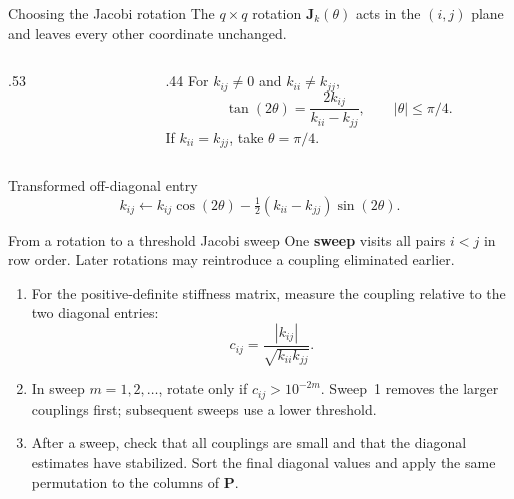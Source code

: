 \documentclass[aspectratio=169]{beamer}
\begin{document}
\begin{frame}{Choosing the Jacobi rotation}
  \small
  The $q\times q$ rotation $\mathbf J_{k}(\theta)$ acts in the $(i,j)$ plane
  and leaves every other coordinate unchanged.
  \vspace{0.2cm}
  \begin{columns}[c,onlytextwidth]
    \begin{column}{.53\textwidth}
      \centering
    \end{column}
    \begin{column}{.44\textwidth}
      \small For $k_{ij}\ne0$ and $k_{ii}\ne k_{jj}$,
      \[
        \tan(2\theta)=\frac{2k_{ij}}{k_{ii}-k_{jj}},
        \qquad |\theta|\leq\pi/4 .
      \]
      If $k_{ii}=k_{jj}$, take $\theta=\pi/4$.
    \end{column}
  \end{columns}
  \vspace{0.2cm}
  \begin{block}{Transformed off-diagonal entry}
    \[
      k_{ij}\gets k_{ij}\cos(2\theta)
      -\tfrac12(k_{ii}-k_{jj})\sin(2\theta).
    \]
  \end{block}
\end{frame}

\begin{frame}{From a rotation to a threshold Jacobi sweep}
  \small
  One \textbf{sweep} visits all pairs $i<j$ in row order. Later rotations may
  reintroduce a coupling eliminated earlier.
  \begin{enumerate}
    \item For the positive-definite stiffness matrix, measure
          the coupling relative to the two diagonal entries:
          \[
            c_{ij}=\frac{|k_{ij}|}{\sqrt{k_{ii}k_{jj}}}.
          \]
    \item In sweep $m=1,2,\ldots$, rotate only if $c_{ij}>10^{-2m}$.
          Sweep~1 removes the larger couplings first; subsequent sweeps use a lower threshold.
    \item After a sweep, check that all couplings are small and that the
          diagonal estimates have stabilized. Sort the final diagonal values
          and apply the same permutation to the columns of $\mathbf P$.
  \end{enumerate}
\end{frame}
\end{document}
